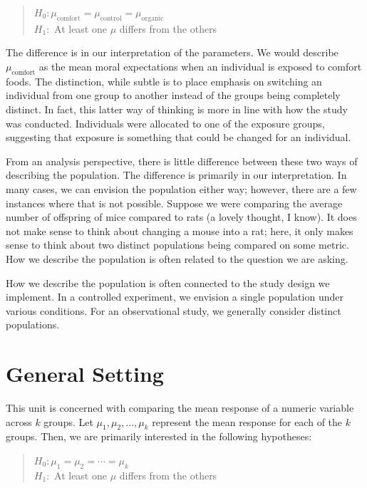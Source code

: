 \documentclass[]{book}
\theoremstyle{definition}
\theoremstyle{definition}
\theoremstyle{remark}
\let\BeginKnitrBlock\begin \let\EndKnitrBlock\end
\begin{document}
\begin{quote}
\(H_0: \mu_{\text{comfort}} = \mu_{\text{control}} = \mu_{\text{organic}}\)\\
\(H_1:\) At least one \(\mu\) differs from the others
\end{quote}

The difference is in our interpretation of the parameters. We would
describe \(\mu_{\text{comfort}}\) as the mean moral expectations when an
individual is exposed to comfort foods. The distinction, while subtle is
to place emphasis on switching an individual from one group to another
instead of the groups being completely distinct. In fact, this latter
way of thinking is more in line with how the study was conducted.
Individuals were allocated to one of the exposure groups, suggesting
that exposure is something that could be changed for an individual.

From an analysis perspective, there is little difference between these
two ways of describing the population. The difference is primarily in
our interpretation. In many cases, we can envision the population either
way; however, there are a few instances where that is not possible.
Suppose we were comparing the average number of offspring of mice
compared to rats (a lovely thought, I know). It does not make sense to
think about changing a mouse into a rat; here, it only makes sense to
think about two distinct populations being compared on some metric. How
we describe the population is often related to the question we are
asking.

\BeginKnitrBlock{rmdtip}
How we describe the population is often connected to the study design we
implement. In a controlled experiment, we envision a single population
under various conditions. For an observational study, we generally
consider distinct populations.
\EndKnitrBlock{rmdtip}

\section{General Setting}\label{general-setting}

This unit is concerned with comparing the mean response of a numeric
variable across \(k\) groups. Let \(\mu_1, \mu_2, \dotsc, \mu_k\)
represent the mean response for each of the \(k\) groups. Then, we are
primarily interested in the following hypotheses:

\begin{quote}
\(H_0: \mu_1 = \mu_2 = \dotsb = \mu_k\)\\
\(H_1:\) At least one \(\mu\) differs from the others
\end{quote}
\end{document}
